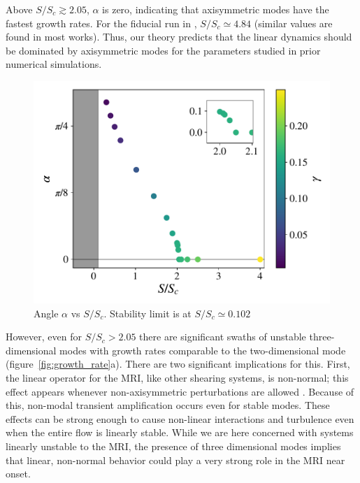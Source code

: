 \documentclass[aps,prl,reprint,superscriptaddress]{revtex4-1}
\newcommand{\SSC}{S/S_{c}}
\begin{document}
Above $\SSC \gtrsim 2.05$, $\alpha$ is zero, indicating that axisymmetric modes have the fastest growth rates.
For the fiducial run in \citet{1996ApJ...464..690H}, $\SSC \simeq 4.84$ (similar values are found in most works).
Thus, our theory predicts that the linear dynamics should be dominated by axisymmetric modes for the parameters studied in prior numerical simulations.
%
\begin{figure}[h!]
  \includegraphics[width=\columnwidth]{alpha_vs_ssc_grid.pdf}
  \caption{Angle $\alpha$ vs $\SSC$. Stability limit is at $\SSC \simeq 0.102$}
  \label{fig:alpha}
\end{figure}
%

However, even for $\SSC> 2.05$ there are significant swaths of unstable three-dimensional modes with growth rates comparable to the two-dimensional mode (figure~\ref{fig:growth_rate}a).
There are two significant implications for this.
First, the linear operator for the MRI, like other shearing systems, is non-normal; this effect appears whenever non-axisymmetric perturbations are allowed \citep[see][for a discussion relevant to the MRI]{1992MNRAS.255P..25K}.
Because of this, non-modal transient amplification occurs even for stable modes.
These effects can be strong enough to cause non-linear interactions and turbulence even when the entire flow is linearly stable.
While we are here concerned with systems linearly unstable to the MRI, the presence of three dimensional modes implies that linear, non-normal behavior could play a very strong role in the MRI near onset.
\end{document}
